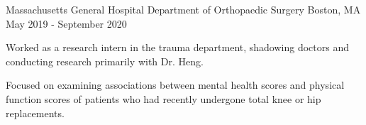 \begin{cventries}
  \cventry
  {Massachusetts General Hospital} %
  {Department of Orthopaedic Surgery} %
  {Boston, MA} %
  {May 2019 - September 2020} %
  {
    \begin{cvitems} %
    \item {Worked as a research intern in the trauma department, shadowing
      doctors and conducting research primarily with Dr. Heng.}
    \item {Focused on examining associations between mental health scores and
        physical function scores of patients who had recently undergone total
      knee or hip replacements.}
    \end{cvitems}
  }

\end{cventries}
